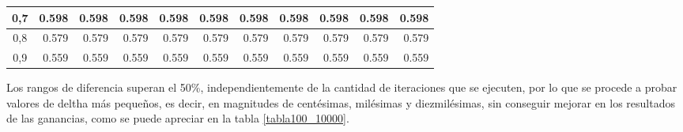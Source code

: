 \begin{table}[H]
\begin{tabular}{|c|r|r|r|r|r|r|r|r|r|r|}
0,7                          & 0.598                    & 0.598                    & 0.598                    & 0.598                    & 0.598                    & 0.598                    & 0.598                    & 0.598                    & 0.598                    & 0.598                     \\ \hline
0,8                          & 0.579                    & 0.579                    & 0.579                    & 0.579                    & 0.579                    & 0.579                    & 0.579                    & 0.579                    & 0.579                    & 0.579                     \\ \hline
0,9                          & 0.559                    & 0.559                    & 0.559                    & 0.559                    & 0.559                    & 0.559                    & 0.559                    & 0.559                    & 0.559                    & 0.559                     \\ \hline
\end{tabular}
\label{tabla10}
\end{table}
Los rangos de diferencia superan el 50\%, independientemente de la cantidad de iteraciones que se ejecuten, por lo que se procede a probar valores de deltha más pequeños, es decir, en magnitudes de centésimas, milésimas y diezmilésimas, sin conseguir mejorar en los resultados de las ganancias, como se puede apreciar en la tabla \ref{tabla100_10000}.

